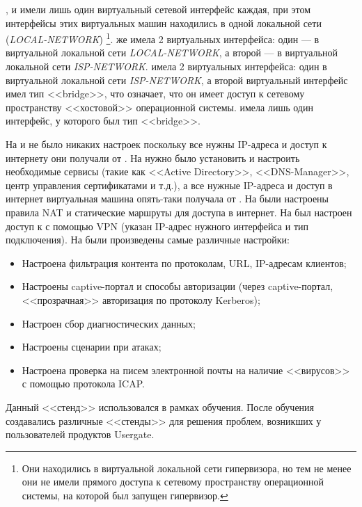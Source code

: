 \CLIA{}, \CLIB{} и \DC{} имели лишь один виртуальный сетевой интерфейс каждая, при этом интерфейсы этих виртуальных машин находились в одной локальной сети (\textit{LOCAL-NETWORK}) \footnote{Они находились в виртуальной локальной сети гипервизора, но тем не менее они не имели прямого доступа к сетевому пространству операционной системы, на которой был запущен гипервизор.}. \UTM{} же имела 2 виртуальных интерфейса: один --- в виртуальной локальной сети \textit{LOCAL-NETWORK}, а второй --- в виртуальной локальной сети \textit{ISP-NETWORK}. \ISP{} имела 2 виртуальных интерфейса: один в виртуальной локальной сети \textit{ISP-NETWORK}, а второй виртуальный интерфейс имел тип <<bridge>>, что означает, что он имеет доступ к сетевому пространству <<хостовой>> операционной системы. \CLIEXT{} имела лишь один интерфейс, у которого был тип <<bridge>>.
			
На \CLIA{} и \CLIB{} не было никаких настроек поскольку все нужны IP-адреса и доступ к интернету они получали от \UTM{}. На \DC{} нужно было установить и настроить необходимые сервисы (такие как <<Active Directory>>, <<DNS-Manager>>, центр управления сертификатами и т.д.), а все нужные IP-адреса и доступ в интернет виртуальная машина опять-таки получала от \UTM{}. На \ISP{} были настроены правила NAT и статические маршруты для доступа в интернет. На \CLIEXT{} был настроен доступ к \UTM{} с помощью VPN (указан IP-адрес нужного интерфейса \UTM{} и тип подключения). На \UTM{} были произведены самые различные настройки:
		
\begin{itemize}
	\item Настроена фильтрация контента по протоколам, URL, IP-адресам клиентов;
			
	\item Настроены captive-портал и способы авторизации (через captive-портал, <<прозрачная>> авторизация по протоколу Kerberos);
			
	\item Настроен сбор диагностических данных;
			
	\item Настроены сценарии при атаках;
			
	\item Настроена проверка на писем электронной почты на наличие <<вирусов>> с помощью протокола ICAP.
\end{itemize}
		
Данный <<стенд>> использовался в рамках обучения. После обучения создавались различные <<стенды>> для решения проблем, возникших у пользователей продуктов Usergate.


